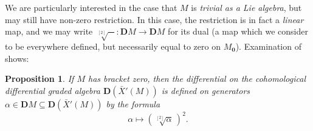 \documentclass[11pt]{amsart} \renewcommand{\baselinestretch}{1.2}
\theoremstyle{plain}
\newtheorem{prop}[thm]{Proposition}
\numberwithin{equation}{section} %
\theoremstyle{plain}
\newtheorem{prop}[thm]{Proposition}
\numberwithin{equation}{chapter} %
\newcommand{\DASH}{\mathrm{-}}
\renewcommand{\to}{\longrightarrow}
\newcommand{\citeBOX}[2][]{\cite[\mbox{#1}]{#2}}
\newcommand{\dualrestn}[1]{\sqrt[{[2]}]{#1}}
\renewcommand{\dualrestn}[1]{\sqrt[{\!\!\![2]}]{#1}}
\newcommand{\UEAX}{\bar{X}'}%
\newcommand{\dual}{\mathbf{D}}
\newcommand{\SectionOrChapter}[1]{\section{\textbf{#1}}}
\begin{document}
\begin{appendices}
We are particularly  interested in the case that $M$ is \emph{trivial as a Lie algebra}, but may still have non-zero restriction. In this case, the restriction is in fact a \emph{linear} map, and we may write $\dualrestn{\DASH}:\dual M\to \dual M$ for its dual (a map which we consider to be everywhere defined, but necessarily equal to zero on $M_{\textbf{0}}$). Examination of  \citeBOX[(6.19)]{MayRestLie.pdf} shows:
\begin{prop}
\label{CEM for trivial lie bracket}
If $M$ has bracket zero, then the differential on the cohomological differential graded algebra $\dual(\UEAX(M))$ is defined on generators $\alpha\in \dual M\subseteq \dual(\UEAX(M))$ by the formula
\[\alpha\longmapsto (\!\sqrt[{[2]}]{\alpha}\,)^2.\]
\end{prop}
%


\end{appendices}

\end{document}
